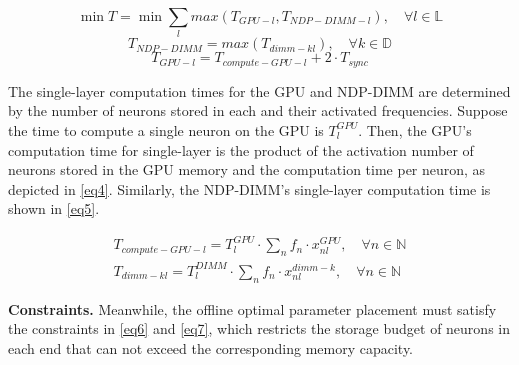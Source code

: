 \begin{equation}
    \min T = \min \textstyle \sum_{l} max (T_{GPU-l}, T_{NDP-DIMM-l}), \quad \forall l \in \mathbb{L} \label{eq1}
\end{equation}
\begin{equation}
     T_{NDP-DIMM} = max (T_{dimm-kl}), \quad \forall k \in \mathbb{D} \label{eq2}
\end{equation}
\begin{equation}
    T_{GPU-l} = T_{compute-GPU-l} + 2\cdot T_{sync} \label{eq3}
\end{equation}

The single-layer computation times for the GPU and NDP-DIMM are determined by the number of neurons stored in each and their activated frequencies. Suppose the time to compute a single neuron on the GPU is $T_{l}^{GPU}$. Then, the GPU's computation time for single-layer is the product of the activation number of neurons stored in the GPU memory and the computation time per neuron, as depicted in \eq \ref{eq4}. Similarly, the NDP-DIMM's single-layer computation time is shown in \eq \ref{eq5}.


\begin{align}
    T_{compute-GPU-l} = T_{l}^{GPU} \cdot \sum_{n} f_{n}\cdot x_{nl}^{GPU}, \quad \forall n \in \mathbb{N} \label{eq4}\\ 
    T_{dimm-kl} = T_{l}^{DIMM} \cdot \sum_{n} f_{n} \cdot x_{nl}^{dimm-k}, \quad \forall n \in \mathbb{N} \label{eq5}
\end{align}

\textbf{Constraints.}
Meanwhile, the offline optimal parameter placement must satisfy the constraints in \eq \ref{eq6} and \ref{eq7}, which restricts the storage budget of neurons in each end that can not exceed the corresponding memory capacity. 


